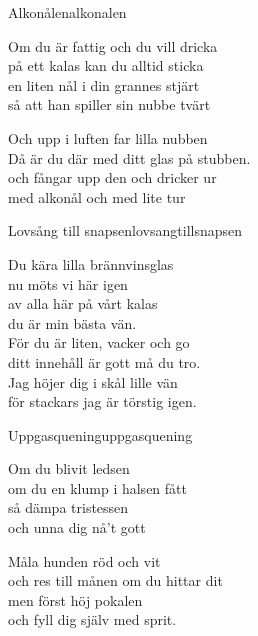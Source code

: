 \begin{song}{Alkonålen}{alkonalen}
\begin{vers}
Om du är fattig och du vill dricka\\
på ett kalas kan du alltid sticka\\
en liten nål i din grannes stjärt\\
så att han spiller sin nubbe tvärt\\
\end{vers}
\begin{vers}
Och upp i luften far lilla nubben\\
Då är du där med ditt glas på stubben.\\
och fångar upp den och dricker ur\\
med alkonål och med lite tur\\
\end{vers}
\end{song}


\newpage
\begin{song}{Lovsång till snapsen}{lovsangtillsnapsen}
\begin{vers}
Du kära lilla brännvinsglas\\
nu möts vi här igen\\
av alla här på vårt kalas\\
du är min bästa vän.\\
För du är liten, vacker och go\\
ditt innehåll är gott må du tro.\\
Jag höjer dig i skål lille vän\\
för stackars jag är törstig igen.\\
\end{vers}
\end{song}

\begin{song}{Uppgasquening}{uppgasquening}
\begin{vers}
Om du blivit ledsen\\
om du en klump i halsen fått\\
så dämpa tristessen \\
och unna dig nå't gott\\
\end{vers}
\begin{vers}
Måla hunden röd och vit\\
och res till månen om du hittar dit\\
men först höj pokalen\\
och fyll dig själv med sprit.\\
\end{vers}
\end{song}

\newpage






